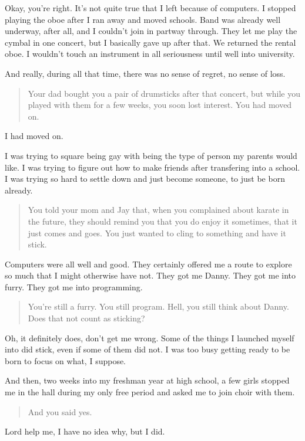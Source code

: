 Okay, you're right. It's not quite true that I left because of computers. I stopped playing the oboe after I ran away and moved schools. Band was already well underway, after all, and I couldn't join in partway through. They let me play the cymbal in one concert, but I basically gave up after that. We returned the rental oboe. I wouldn't touch an instrument in all seriousness until well into university.

And really, during all that time, there was no sense of regret, no sense of loss.

\begin{quote}
Your dad bought you a pair of drumsticks after that concert, but while you played with them for a few weeks, you soon lost interest. You had moved on.
\end{quote}

I had moved on.

I was trying to square being gay with being the type of person my parents would like. I was trying to figure out how to make friends after transfering into a school. I was trying so hard to settle down and just become someone, to just be born already.

\begin{quote}
You told your mom and Jay that, when you complained about karate in the future, they should remind you that you do enjoy it sometimes, that it just comes and goes. You just wanted to cling to something and have it stick.
\end{quote}

Computers were all well and good. They certainly offered me a route to explore so much that I might otherwise have not. They got me Danny. They got me into furry. They got me into programming.

\begin{quote}
You're still a furry. You still program. Hell, you still think about Danny. Does that not count as sticking?
\end{quote}

Oh, it definitely does, don't get me wrong. Some of the things I launched myself into did stick, even if some of them did not. I was too busy getting ready to be born to focus on what, I suppose.

And then, two weeks into my freshman year at high school, a few girls stopped me in the hall during my only free period and asked me to join choir with them.

\begin{quote}
And you said yes.
\end{quote}

Lord help me, I have no idea why, but I did.
